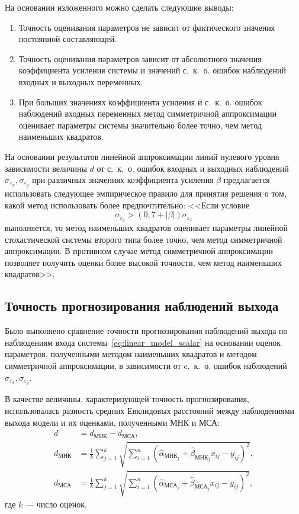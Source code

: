 На основании изложенного можно сделать следуюшие выводы:
\begin{enumerate}
\item Точность оценивания параметров не зависит от фактического значения
  постоянной составляющей.
\item Точность оценивания параметров зависит от абсолютного значения
  коэффициента усиления системы и значений с.~к.~о. ошибок наблюдений
  входных и выходных переменных.
\item При больших значениях коэффициента усиления и с.~к.~о. ошибок наблюдений
  входных переменных метод симметричной аппроксимации оценивает
  параметры системы значительно более точно, чем метод наименьших квадратов.
\end{enumerate}

На основании результатов линейной аппроксимации линий нулевого уровня
зависимости величины \( d \) от с.~к.~о. ошибок входных и выходных наблюдений
\( \sigma_{\varepsilon_x}, \sigma_{\varepsilon_y} \)
при различных значениях коэффициента усиления \( \beta \) предлагается использовать
следующее эмпирическое правило для принятия решения о том, какой метод
использовать более предпочтительно:
<<Если условие
\begin{equation}
  \sigma_{\varepsilon_y} > (0{,}7 + |\beta|) \sigma_{\varepsilon_x}
  \label{eq:linear_rule_param}
\end{equation}
выполняется, то метод наименьших квадратов оценивает параметры линейной
стохастической системы второго типа более точно, чем метод симметричной аппроксимации.
В противном случае метод симметричной аппроксимации позволяет получить
оценки более высокой точности, чем метод наименьших квадратов>>.

\vspace{2\baselineskip}
\subsection{Точность прогнозирования наблюдений выхода}

Было выполнено сравнение точности прогнозирования наблюдений выхода по
наблюдениям входа системы~\eqref{eq:linear_model_scalar} на основании оценок параметров,
полученными методом наименьших квадратов и методом симметричной аппроксимации,
в зависимости от c.~к.~о. ошибок наблюдений \( \sigma_{\varepsilon_x}, \sigma_{\varepsilon_y} \).

В качестве величины, характеризующей точность прогнозирования,
использовалась разность средних Евклидовых расстояний между наблюдениями выхода модели и
их оценками, полученными МНК и МСА:
\begin{equation*}
  \begin{aligned}
    d &= d_{\text{МНК}} - d_{\text{МСА}}, \\
    d_{\text{МНК}} &= \frac{1}{k} \sum_{j=1}^k \sqrt{ \sum_{i=1}^n (\hat{\alpha}_{\text{МНК}_j} + \hat{\beta}_{\text{МНК}_j} x_{ij} - y_{ij})^2}, \\
    d_{\text{МСА}} &= \frac{1}{k} \sum_{j=1}^k \sqrt{ \sum_{i=1}^n (\hat{\alpha}_{\text{МСА}_j} + \hat{\beta}_{\text{МСА}_j} x_{ij} - y_{ij})^2},
    \end{aligned}
  \end{equation*}
где \( k \) --- число оценок.

